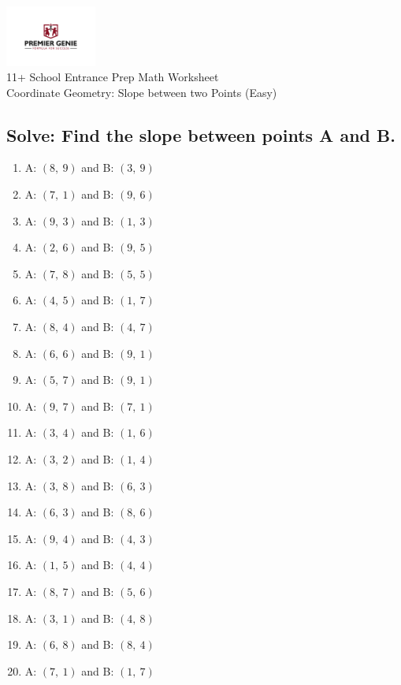\documentclass{article}
\begin{document}
\begin{center}
\includegraphics[width=3cm]{PREMGENIEJPG.jpg}\\
{\Large 11+ School Entrance Prep Math Worksheet}\\
{\Medium Coordinate Geometry: Slope between two Points (Easy)}\\

\end{center}

\subsection*{Solve: Find the slope between points A and B.}

\begin{enumerate}
\item A: $\left( 8, \  9\right)$ and B: $\left( 3, \  9\right)$ 
\item A: $\left( 7, \  1\right)$ and B: $\left( 9, \  6\right)$ 
\item A: $\left( 9, \  3\right)$ and B: $\left( 1, \  3\right)$ 
\item A: $\left( 2, \  6\right)$ and B: $\left( 9, \  5\right)$ 
\item A: $\left( 7, \  8\right)$ and B: $\left( 5, \  5\right)$ 
\item A: $\left( 4, \  5\right)$ and B: $\left( 1, \  7\right)$ 
\item A: $\left( 8, \  4\right)$ and B: $\left( 4, \  7\right)$ 
\item A: $\left( 6, \  6\right)$ and B: $\left( 9, \  1\right)$ 
\item A: $\left( 5, \  7\right)$ and B: $\left( 9, \  1\right)$ 
\item A: $\left( 9, \  7\right)$ and B: $\left( 7, \  1\right)$ 
\item A: $\left( 3, \  4\right)$ and B: $\left( 1, \  6\right)$ 
\item A: $\left( 3, \  2\right)$ and B: $\left( 1, \  4\right)$ 
\item A: $\left( 3, \  8\right)$ and B: $\left( 6, \  3\right)$ 
\item A: $\left( 6, \  3\right)$ and B: $\left( 8, \  6\right)$ 
\item A: $\left( 9, \  4\right)$ and B: $\left( 4, \  3\right)$ 
\item A: $\left( 1, \  5\right)$ and B: $\left( 4, \  4\right)$ 
\item A: $\left( 8, \  7\right)$ and B: $\left( 5, \  6\right)$ 
\item A: $\left( 3, \  1\right)$ and B: $\left( 4, \  8\right)$ 
\item A: $\left( 6, \  8\right)$ and B: $\left( 8, \  4\right)$ 
\item A: $\left( 7, \  1\right)$ and B: $\left( 1, \  7\right)$ 


\end{enumerate}
\end{document}
